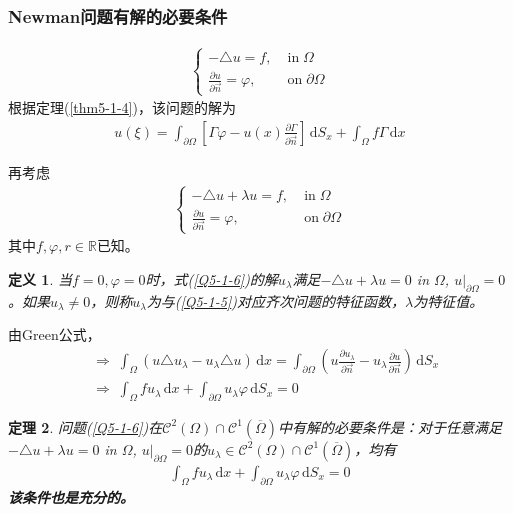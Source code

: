 \documentclass[11pt, a4paper]{article}
\theoremstyle{theorem}
\newtheorem{thm}{定理}[section]
\newtheorem{definition}[thm]{定义}
\newcommand{\intd}[1]{\,\mathrm{d}{#1}}
\begin{document}
\subsubsection{Newman问题有解的必要条件}

\begin{align}
\label{Q5-1-5}
    \begin{cases}
        - \triangle u = f, &\; \text{in} \; \Omega \\
        \frac{\partial u}{\partial \vec{n}} = \varphi, &\; \text{on} \; \partial \Omega
    \end{cases}
\end{align}
根据定理(\ref{thm5-1-4})，该问题的解为
\begin{align}
    u(\xi) = \int_{\partial \Omega} \left[\Gamma \varphi - u(x) \frac{\partial \Gamma}{\partial \vec{n}}\right] \intd S_x + \int_\Omega f\Gamma \intd x
\end{align}

再考虑
\begin{align}
\label{Q5-1-6}
    \begin{cases}
        - \triangle u + \lambda u = f, &\; \text{in} \; \Omega \\
        \frac{\partial u}{\partial \vec{n}} = \varphi, &\; \text{on} \; \partial \Omega
    \end{cases}
\end{align}
其中$f,\varphi, r \in \mathbb{R}$已知。

\begin{definition}
    当$f = 0, \varphi = 0$时，式(\ref{Q5-1-6})的解$u_\lambda$满足$- \triangle u + \lambda u = 0$ in $\Omega$, $u \bigg|_{\partial \Omega} = 0$。如果$u_\lambda \neq 0$，则称$u_\lambda$为与(\ref{Q5-1-5})对应齐次问题的特征函数，$\lambda$为特征值。
\end{definition}
由Green公式，
\begin{align*}
    &\Longrightarrow \; \int_\Omega \left(u \triangle u_\lambda - u_\lambda \triangle u\right) \intd x = \int_{\partial \Omega} \left(u \frac{\partial u_\lambda}{\partial \vec{n}} - u_\lambda \frac{\partial u}{\partial \vec{n}}\right) \intd S_x \\
    &\Longrightarrow \; \int_\Omega f u_\lambda \intd x + \int_{\partial \Omega} u_\lambda \varphi \intd S_x = 0
\end{align*}

\begin{thm}
    问题(\ref{Q5-1-6})在$\mathcal{C}^2(\Omega) \cap \mathcal{C}^1(\overline{\Omega})$中有解的必要条件是：对于任意满足$- \triangle u + \lambda u = 0$ in $\Omega$, $u \bigg|_{\partial \Omega} = 0$的$u_\lambda \in \mathcal{C}^2(\Omega) \cap \mathcal{C}^1(\overline{\Omega})$，均有
    \begin{align}
        \int_\Omega f u_\lambda \intd x + \int_{\partial \Omega} u_\lambda \varphi \intd S_x = 0
    \end{align}
    \textbf{该条件也是充分的。}
\end{thm}
\end{document}
